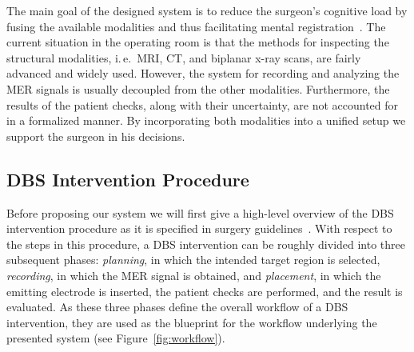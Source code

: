 \documentclass[review]{vgtc}                 %
\begin{document}
The main goal of the designed system is to reduce the surgeon's cognitive load by fusing the available modalities and thus facilitating mental registration~\cite{Tory1998}. The current situation in the operating room is that the methods for inspecting the structural modalities, i.\,e.~MRI, CT, and biplanar x-ray scans, are fairly advanced and widely used. However, the system for recording and analyzing the MER signals is usually decoupled from the other modalities. Furthermore, the results of the patient checks, along with their uncertainty, are not accounted for in a formalized manner. By incorporating both modalities into a unified setup we support the surgeon in his decisions.

\subsection{DBS Intervention Procedure}\label{sec:overview:procedure}
Before proposing our system we will first give a high-level overview of the DBS intervention procedure as it is specified in surgery guidelines~\cite{Hemm2010}. With respect to the steps in this procedure, a DBS intervention can be roughly divided into three subsequent phases: \emph{planning}, in which the intended target region is selected, \emph{recording}, in which the MER signal is obtained, and \emph{placement}, in which the emitting electrode is inserted, the patient checks are performed, and the result is evaluated. As these three phases define the overall workflow of a DBS intervention, they are used as the blueprint for the workflow underlying the presented system (see Figure~\ref{fig:workflow}).
\end{document}
